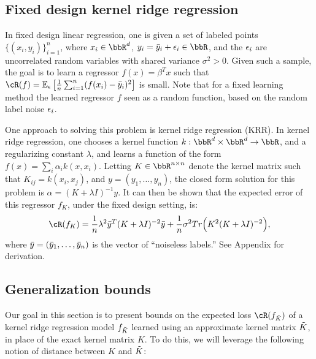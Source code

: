 \subsection{Fixed design kernel ridge regression}
In fixed design linear regression, one is given a set of labeled points $\{(x_i,y_i)\}_{i=1}^n$, where $x_i \in \RR^d$, $y_i = \by_i + \eps_i \in \RR$, and the $\epsilon_i$ are uncorrelated random variables with shared variance $\sigma^2 > 0$.  Given such a sample, the goal is to learn a regressor $f(x) = \beta^T x$ such that $\cR(f) = \expect{\eps}{\frac{1}{n}\sum_{i=1}^n (f(x_i) - \by_i)^2}$ is small. Note that for a fixed learning method the learned regressor $f$ seen as a random function, based on the random label noise $\epsilon_i$.

One approach to solving this problem is kernel ridge regression (KRR).  In kernel ridge regression, one chooses a kernel function $k:\RR^d\times\RR^d\rightarrow \RR$, and a regularizing constant $\lambda$, and learns a function of the form $f(x) = \sum_i \alpha_i k(x,x_i)$.  Letting $K\in\RR^{n\times n}$ denote the kernel matrix such that $K_{ij} = k(x_i,x_j)$, and $y = (y_1,\ldots,y_n)$, the closed form solution for this problem is $\alpha = (K+\lambda I)^{-1}y$. It can then be shown that the expected error of this regressor $f_K$, under the fixed design setting, is:
\begin{eqnarray}
\cR(f_K) = \frac{1}{n}\lambda^2 \by^T(K+\lambda I)^{-2}\by + \frac{1}{n}\sigma^2 Tr\Big(K^2(K+\lambda \id)^{-2}\Big),
\end{eqnarray}
where $\bar{y} = (\bar{y}_1,\ldots,\bar{y}_n)$ is the vector of ``noiseless labels.'' See Appendix  for derivation.

\subsection{Generalization bounds}
\label{sec:genbound}
Our goal in this section is to present bounds on the expected loss $\cR(f_{\tK})$ of a kernel ridge regression model $f_{\tilde{K}}$ learned using an approximate kernel matrix $\tilde{K}$, in place of the exact kernel matrix $K$. To do this, we will leverage the following notion of distance between $K$ and $\tilde{K}$:

